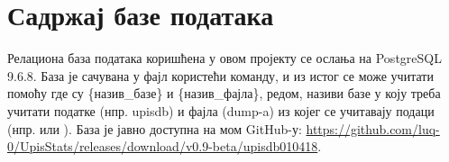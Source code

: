 \chapter{Садржај базе података}\label{ch:B}

Релациона база података коришћена у овом пројекту се ослања на PostgreSQL 9.6.8. База је сачувана у фајл користећи  команду, и из истог се може учитати помоћу  где су \{назив\_базе\} и \{назив\_фајла\}, редом, називи базе у коју треба учитати податке (нпр. upisdb) и фајла (dump-a) из којег се учитавају подаци (нпр.  или ). База је јавно доступна на мом GitHub-у: \url{https://github.com/luq-0/UpisStats/releases/download/v0.9-beta/upisdb010418}.